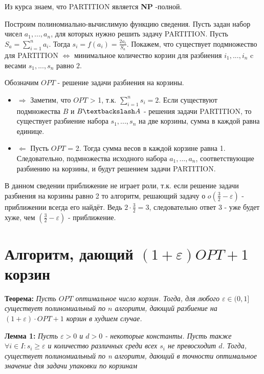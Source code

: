 \documentclass[a4paper,14pt,russian]{article}
\begin{document}
Из курса знаем, что PARTITION является {\bf NP} -полной. 

Построим полиномиально-вычислимую функцию сведения. Пусть задан набор чисел $a_1, ..., a_n$, для которых нужно решить задачу  PARTITION. Пусть $S_a = \sum_{i=1}^n a_i$. Тогда $s_i = f(a_i) = \frac{2a_i}{S_a}$. Покажем, что существует подмножество для PARTITION $\Leftrightarrow$ минимальное количество корзин для разбиения $i_1, ..., i_n$ c весами $s_1, ..., s_n$ равно $2$.

Обозначим $OPT$ - решение задачи разбиения на корзины.

\begin{itemize}
  \item $\Rightarrow$ Заметим, что $OPT$ > 1, т.к. $\sum_{i = 1}^n s_i = 2$. Если существуют подмножества $B$ и $B \textbackslash A$ - решения задачи PARTITION, то существует разбиение набора $s_1, ..., s_n$ на две корзины, сумма в каждой равна единице.
  
  \item $\Leftarrow$ Пусть $OPT$ = 2. Тогда сумма весов в каждой корзине равна 1. Следовательно, подмножества исходного набора $a_1, ..., a_n$, соответствующие разбиению на корзины, и будут решением задачи PARTITION.
  
\end{itemize}

В данном сведении приближение не играет роли, т.к. если решение задачи разбиения на корзины равно 2 то алгоритм, решающий задачу о $o(\frac{3}{2} - \varepsilon)$ - приближении всегда его найдёт. Ведь $2 \cdot \frac{3}{2} = 3$, следовательно ответ 3 - уже будет хуже, чем $(\frac{3}{2} - \varepsilon)$ - приближение.

\newpage
\section {Алгоритм, дающий $(1 + \varepsilon)OPT + 1$ корзин}

{\bf Теорема:} \textit{Пусть $OPT$ оптимальное число корзин. Тогда, для любого $\varepsilon \in (0, 1]$ существует полиномиальный по $n$ алгоритм, дающий разбиение на $(1 + \varepsilon) \cdot OPT + 1$ корзин в худшем случае.}

{\bf Лемма 1:} \textit{Пусть $\varepsilon > 0$ и $d > 0$ - некоторые константы. Пусть также $\forall i \in I: s_i \geq \varepsilon$ и количество различных среди всех $s_i$ не превосходит $d$. Тогда, существует полиномиальный по n алгоритм, дающий в точности оптимальное значение для задачи упаковки по корзинам}
\end{document}
